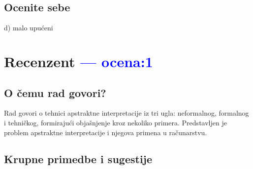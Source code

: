 \documentclass[a4paper]{report}
\newcommand{\odgovor}[1]{\textcolor{blue}{#1}}
\begin{document}
\section{Ocenite sebe}
d) malo upućeni 


\chapter{Recenzent \odgovor{--- ocena:1} }


\section{O čemu rad govori?}
Rad govori o tehnici apstraktne interpretacije iz tri ugla: neformalnog, formalnog i tehničkog, formirajući objašnjenje kroz nekoliko primera. Predstavljen je problem apstraktne interpretacije i njegova primena u računarstvu.
 
\section{Krupne primedbe i sugestije}
\end{document}
